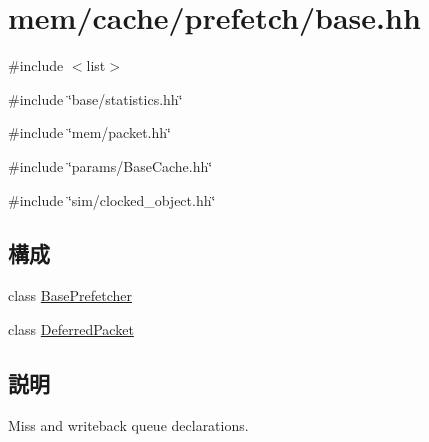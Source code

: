 \hypertarget{mem_2cache_2prefetch_2base_8hh}{
\section{mem/cache/prefetch/base.hh}
\label{mem_2cache_2prefetch_2base_8hh}
}
{\ttfamily \#include $<$list$>$}\par
{\ttfamily \#include \char`\"{}base/statistics.hh\char`\"{}}\par
{\ttfamily \#include \char`\"{}mem/packet.hh\char`\"{}}\par
{\ttfamily \#include \char`\"{}params/BaseCache.hh\char`\"{}}\par
{\ttfamily \#include \char`\"{}sim/clocked\_\-object.hh\char`\"{}}\par
\subsection*{構成}
\begin{DoxyCompactItemize}
\item 
class \hyperlink{classBasePrefetcher}{BasePrefetcher}
\item 
class \hyperlink{classBasePrefetcher_1_1DeferredPacket}{DeferredPacket}
\end{DoxyCompactItemize}


\subsection{説明}
Miss and writeback queue declarations. 